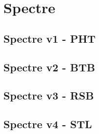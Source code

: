 \section{Spectre}
\subsection{Spectre v1 - PHT}
\subsection{Spectre v2 - BTB}
\subsection{Spectre v3 - RSB}
\subsection{Spectre v4 - STL}
